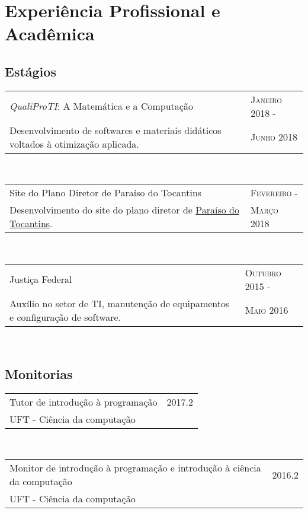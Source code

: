 \section{Experiência Profissional e Acadêmica}

\subsection*{Estágios}

\begin{tabular}{p{11cm}|l}
  \textit{QualiProTI}: A Matemática e a Computação & \textsc{Janeiro 2018 -} \\
  \footnotesize{Desenvolvimento de softwares e materiais didáticos voltados à otimização aplicada.} & \textsc{Junho 2018} \\
\end{tabular}\\

\begin{tabular}{p{11cm}|l}
  Site do Plano Diretor de Paraíso do Tocantins & \textsc{Fevereiro -} \\
  \footnotesize{Desenvolvimento do site do plano diretor de \href{https://planodiretorparaiso.com.br/}{Paraíso do Tocantins}.} & \textsc{Março 2018} \\
\end{tabular}\\

\begin{tabular}{p{11cm}|l}
  Justiça Federal & \textsc{Outubro 2015 -} \\
  \footnotesize{Auxílio no setor de TI, manutenção de equipamentos e configuração de software.} & \textsc{Maio 2016}  \\
\end{tabular}\\



\subsection*{Monitorias}

\begin{tabular}{p{11cm}|r}
  Tutor de introdução à programação & \textsc{2017.2} \\
  UFT - Ciência da computação & \\
\end{tabular}\\

\begin{tabular}{p{11cm}|r}
    Monitor de introdução à programação e introdução à ciência da computação & \textsc{2016.2} \\
    UFT - Ciência da computação & \\
  \end{tabular}\\
